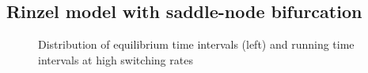 \documentclass[12pt,a4paper]{article}
\begin{document}
\subsection{Rinzel model with saddle-node bifurcation}
\begin{figure}[H]
	\hspace*{-0.5cm}
	\caption{Distribution of equilibrium time intervals (left) and running time intervals at high switching rates}
	\label{intdistrinzel}
\end{figure}
\end{document}
